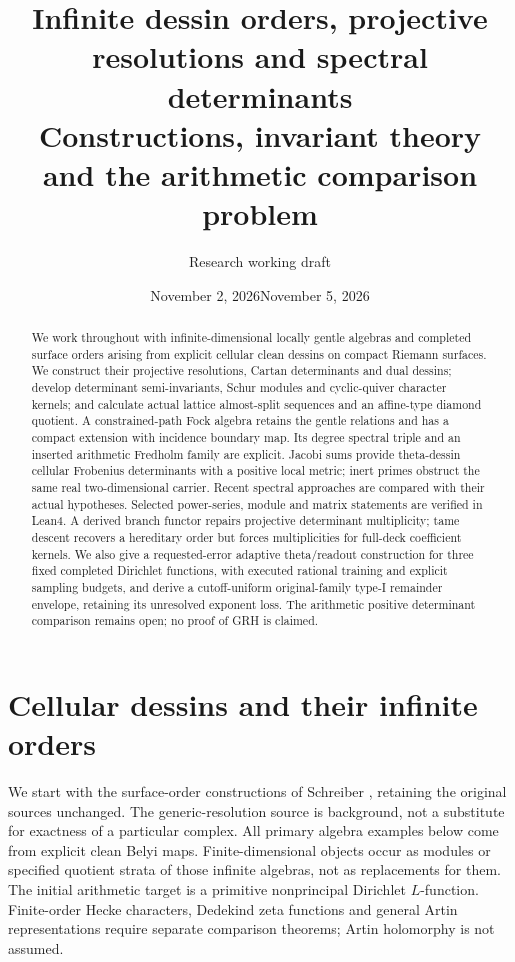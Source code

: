 \documentclass[11pt]{article}
\date{November 2, 2026}
\date{November 5, 2026}
\title{Infinite dessin orders, projective resolutions and spectral determinants\\\large Constructions, invariant theory and the arithmetic comparison problem}
\author{Research working draft}
\theoremstyle{definition}\newtheorem{definition}[theorem]{Definition}
\theoremstyle{remark}\newtheorem{remark}[theorem]{Remark}
\begin{document}
\maketitle
\begin{abstract}
We work throughout with infinite-dimensional locally gentle algebras and completed surface orders arising from explicit cellular clean dessins on compact Riemann surfaces. We construct their projective resolutions, Cartan determinants and dual dessins; develop determinant semi-invariants, Schur modules and cyclic-quiver character kernels; and calculate actual lattice almost-split sequences and an affine-type diamond quotient. A constrained-path Fock algebra retains the gentle relations and has a compact extension with incidence boundary map. Its degree spectral triple and an inserted arithmetic Fredholm family are explicit. Jacobi sums provide theta-dessin cellular Frobenius determinants with a positive local metric; inert primes obstruct the same real two-dimensional carrier. Recent spectral approaches are compared with their actual hypotheses. Selected power-series, module and matrix statements are verified in Lean4. A derived branch functor repairs projective determinant multiplicity; tame descent recovers a hereditary order but forces multiplicities for full-deck coefficient kernels. We also give a requested-error adaptive theta/readout construction for three fixed completed Dirichlet functions, with executed rational training and explicit sampling budgets, and derive a cutoff-uniform original-family type-I remainder envelope, retaining its unresolved exponent loss. The arithmetic positive determinant comparison remains open; no proof of GRH is claimed.
\end{abstract}
{\small\tableofcontents}
\section{Cellular dessins and their infinite orders}
We start with the surface-order constructions of Schreiber \cite{SurfaceOrders,SurfaceDuality}, retaining the original sources unchanged. The generic-resolution source \cite{Persistence} is background, not a substitute for exactness of a particular complex. All primary algebra examples below come from explicit clean Belyi maps. Finite-dimensional objects occur as modules or specified quotient strata of those infinite algebras, not as replacements for them. The initial arithmetic target is a primitive nonprincipal Dirichlet $L$-function. Finite-order Hecke characters, Dedekind zeta functions and general Artin representations require separate comparison theorems; Artin holomorphy is not assumed.
\end{document}
